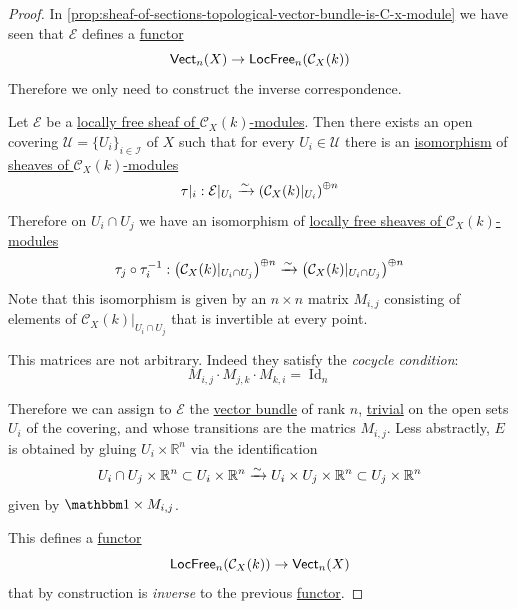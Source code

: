 \documentclass[../../../main]{subfiles}
\begin{document}
\begin{proof}
  In \autoref{prop:sheaf-of-sections-topological-vector-bundle-is-C-x-module} we have seen that \(\mathcal{E}\) defines a \hyperref[def:functor]{functor}
  \begin{equation*}
    \mathsf{Vect}_{n}(X) \to \mathsf{LocFree}_{n}(\mathcal{C}_{X}(k))
  \end{equation*}
  Therefore we only need to construct the inverse correspondence.

  Let \(\mathcal{E}\) be a \hyperref[def:locally-free-sheaf]{locally free sheaf of \(\mathcal{C}_{X}(k)\)-modules}.
  Then there exists an open covering \(\mathcal{U} = \{U_{i}\}_{i \in \mathcal{I}}\) of \(X\) such that for every \(U_{i} \in \mathcal{U}\) there is an \hyperref[def:categorical-isomorphism]{isomorphism} of \hyperref[def:sheaf-of-modules]{sheaves of \(\mathcal{C}_{X}(k)\)-modules}
  \begin{equation*}
    \tau|_{i}: \mathcal{E}|_{U_{i}} \xrightarrow{\sim} \left( \mathcal{C}_{X}(k)|_{U_{i}} \right)^{\oplus n}
  \end{equation*}
  Therefore on \(U_{i} \cap U_{j}\) we have an isomorphism of \hyperref[def:locally-free-sheaf]{locally free sheaves of \(\mathcal{C}_{X}(k)\)-modules}
  \begin{equation*}
    \tau_{j} \circ \tau_{i}^{-1}: \left( \mathcal{C}_{X}(k)|_{U_{i} \cap U_{j}}  \right)^{\oplus n} \xrightarrow{\sim} \left( \mathcal{C}_{X}(k)|_{U_{i} \cap U_{j}}  \right)^{\oplus n}
  \end{equation*}
  Note that this isomorphism is given by an \(n \times n\) matrix \(M_{i,j}\) consisting of elements of \(\mathcal{C}_{X}(k)|_{U_{i} \cap U_{j}}\) that is invertible at every point.

  This matrices are not arbitrary.
  Indeed they satisfy the \textit{cocycle condition}:
  \begin{equation*}
    M_{i, j} \cdot M_{j, k} \cdot M_{k, i} = \operatorname{Id}_{n}
  \end{equation*}
  
  Therefore we can assign to \(\mathcal{E}\) the \hyperref[def:vector-bundle]{vector bundle} of rank \(n\), \hyperref[ex:trivial-vector-bundle]{trivial} on the open sets \(U_{i}\) of the covering, and whose transitions are the matrics \(M_{i,j}\).
  Less abstractly, \(E\) is obtained by gluing \(U_{i} \times \mathbb{R}^{n}\) via the identification
  \begin{equation*}
    U_{i} \cap U_{j} \times \mathbb{R}^{n} \subset U_{i} \times \mathbb{R}^{n} \xrightarrow{\sim} U_{i} \times U_{j} \times \mathbb{R}^{n} \subset U_{j} \times \mathbb{R}^{n}
  \end{equation*}
  given by \(\id \times M_{i, j}\).

  This defines a \hyperref[def:functor]{functor}
  \begin{equation*}
    \mathsf{LocFree}_{n}(\mathcal{C}_{X}(k)) \to \mathsf{Vect}_{n}(X)
  \end{equation*}
  that by construction is \textit{inverse} to the previous \hyperref[def:functor]{functor}.
\end{proof}
\end{document}
